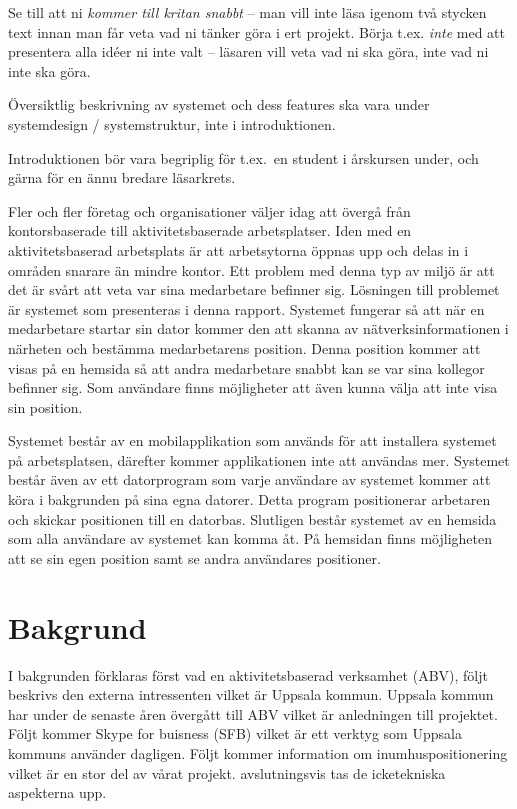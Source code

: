 \documentclass[swedish, a4paper,12pt]{article}
\begin{document}
Se till att ni \emph{kommer till kritan snabbt} – man vill inte läsa igenom två stycken text innan man får veta vad ni tänker göra i ert projekt.  Börja t.ex. \emph{inte} med att presentera alla idéer ni inte valt – läsaren vill veta vad ni ska göra, inte vad ni inte ska göra.

Översiktlig beskrivning av systemet och dess features ska vara under systemdesign / systemstruktur, inte i introduktionen.

Introduktionen bör vara begriplig för t.ex.~en student i årskursen under, och gärna för en ännu bredare läsarkrets.
\fi

Fler och fler företag och organisationer väljer idag att övergå från kontorsbaserade till aktivitetsbaserade arbetsplatser. Iden med en aktivitetsbaserad arbetsplats är att arbetsytorna öppnas upp och delas in i områden snarare än mindre kontor. Ett problem med denna typ av miljö är att det är svårt att veta var sina medarbetare befinner sig. Lösningen till problemet är systemet som presenteras i denna rapport. Systemet fungerar så att när en medarbetare startar sin dator kommer den att skanna av nätverksinformationen i närheten och bestämma medarbetarens position. Denna position kommer att visas på en hemsida så att andra medarbetare snabbt kan se var sina kollegor befinner sig. Som användare finns möjligheter att även kunna välja att inte visa sin position.

Systemet består av en mobilapplikation som används för att installera systemet på arbetsplatsen, därefter kommer applikationen inte att användas mer. Systemet består även av ett datorprogram som varje användare av systemet kommer att köra i bakgrunden på sina egna datorer. Detta program positionerar arbetaren och skickar positionen till en datorbas. Slutligen består systemet av en hemsida som alla användare av systemet kan komma åt. På hemsidan finns möjligheten att se sin egen position samt se andra användares positioner.



\section{Bakgrund}
I bakgrunden förklaras först vad en aktivitetsbaserad verksamhet (ABV), följt beskrivs den externa intressenten vilket är Uppsala kommun. Uppsala kommun har under de senaste åren övergått till ABV vilket är anledningen till projektet. Följt kommer Skype for buisness (SFB) vilket är ett verktyg som Uppsala kommuns använder dagligen. Följt kommer information om inumhuspositionering vilket är en stor del av vårat projekt. avslutningsvis tas de icketekniska aspekterna upp.
\end{document}
